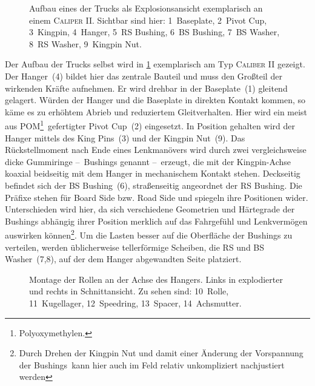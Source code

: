 		\begin{figure}[h]
			\centering
			
			\caption[Explosionsansicht eines der Trucks]{Aufbau eines der Trucks als Explosionsansicht exemplarisch an einem \textsc{Caliper II}. Sichtbar sind hier: 1~Baseplate, 2~Pivot Cup, 3~Kingpin, 4~Hanger, 5~RS Bushing, 6~BS Bushing, 7~BS Washer, 8~RS Washer, 9~Kingpin Nut.}\label{fig:caliper exploded}
		\end{figure}
		Der Aufbau der Trucks selbst wird in \cref{fig:caliper exploded} exemplarisch am Typ \textsc{Caliber II} gezeigt.
		Der Hanger~(4) bildet hier das zentrale Bauteil und muss den Großteil der wirkenden Kräfte aufnehmen.
		Er wird drehbar in der Baseplate~(1) gleitend gelagert.
		Würden der Hanger und die Baseplate in direkten Kontakt kommen, so käme es zu erhöhtem Abrieb und reduziertem Gleitverhalten.
		Hier wird ein meist aus POM\footnote{\hspace{1mm} Polyoxymethylen.}~gefertigter Pivot Cup~(2) eingesetzt.
		In Position gehalten wird der Hanger mittels des King Pins~(3) und der Kingpin Nut~(9).
		Das Rückstellmoment nach Ende eines Lenkmanövers wird durch zwei vergleichsweise dicke Gummiringe --~Bushings genannt --~erzeugt, die mit der Kingpin-Achse koaxial beidseitig mit dem Hanger in mechanischem Kontakt stehen.
		Deckseitig befindet sich der BS Bushing~(6), straßenseitig angeordnet der RS Bushing.
		Die Präfixe stehen für Board Side bzw. Road Side und spiegeln ihre Positionen wider.
		Unterschieden wird hier, da sich verschiedene Geometrien und Härtegrade der Bushings abhängig ihrer Position merklich auf das Fahrgefühl und Lenkvermögen auswirken können\footnote{\hspace{1mm} Durch Drehen der Kingpin Nut und damit einer Änderung der Vorspannung der Bushings~kann hier auch im Feld relativ unkompliziert nachjustiert werden}.
		Um die Lasten besser auf die Oberfläche der Bushings zu verteilen, werden üblicherweise tellerförmige Scheiben, die RS und BS Washer~(7,8), auf der dem Hanger abgewandten Seite platziert.\par\medskip
		\begin{figure}[h]
			\centering
			
			\caption[Montage der Rollen an der Achse des Hanger]{Montage der Rollen an der Achse des Hangers. Links in explodierter und rechts in Schnittansicht. Zu sehen sind: 10~Rolle, 11~Kugellager, 12~Speedring, 13~Spacer, 14~Achsmutter.}\label{fig:wheel NT exploded}
		\end{figure}
